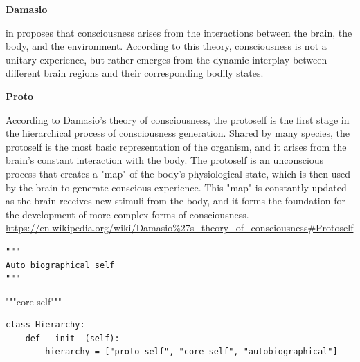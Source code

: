 \documentclass{book}
\providecommand{\ProjectDeepHeading}[2]{%
    \par\medskip\noindent\textbf{#2}\par\smallskip
}
\begin{document}
\ProjectDeepHeading{4}{Damasio}


in \cite{damasio-1999-the-feeling-of-what-happens} proposes that consciousness arises from the interactions between the brain, the body, and the environment. According to this theory, consciousness is not a unitary experience, but rather emerges from the dynamic interplay between different brain regions and their corresponding bodily states.

\ProjectDeepHeading{5}{Proto}


According to Damasio's theory of consciousness, the protoself is the first stage in the hierarchical process of consciousness generation. Shared by many species, the protoself is the most basic representation of the organism, and it arises from the brain's constant interaction with the body. The protoself is an unconscious process that creates a "map" of the body's physiological state, which is then used by the brain to generate conscious experience. This "map" is constantly updated as the brain receives new stimuli from the body, and it forms the foundation for the development of more complex forms of consciousness.
    \url{https://en.wikipedia.org/wiki/Damasio%27s_theory_of_consciousness#Protoself}
    


\begin{verbatim}
"""
Auto biographical self
"""
\end{verbatim}


"""core self"""


\begin{verbatim}
class Hierarchy:
    def __init__(self):
        hierarchy = ["proto self", "core self", "autobiographical"]
\end{verbatim}
\end{document}
